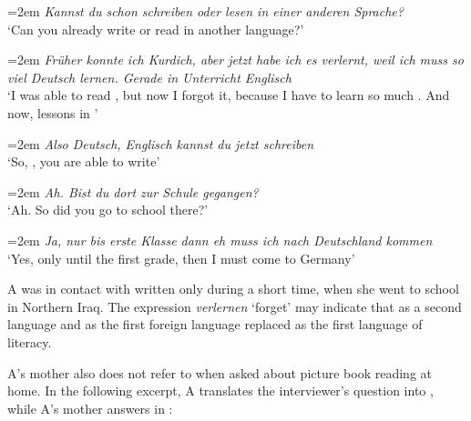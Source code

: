 \documentclass[output=paper,colorlinks,citecolor=brown]{langscibook}
\newenvironment{interview}{
  \setlength{\leftskip}{2.5em} %
  \setlength{\rightskip}{2.5em} %
  \setlength{\parindent}{0pt} %
  \vspace{\topsep} %
}{
  \vspace{\topsep} %
}
\newcommand{\speaker}[1]{%
  \noindent\hangindent=2em\makebox[1.5em][l]{#1:}\hspace{0.5em}%
}
\newcommand{\myattrib}[1]{%
    \attrib{#1}
}
\begin{document}
\begin{interview}\label{ch2.5.ex.15}
\speaker{I}\textit{Kannst du schon schreiben oder lesen in einer anderen Sprache?} \\
`Can you already write or read in another language?' 

\speaker{A}\textit{Früher konnte ich Kurdich, aber jetzt habe ich es verlernt, weil ich muss so viel Deutsch lernen. Gerade in Unterricht Englisch} \\
`I was able to read , but now I forgot it, because I have to learn so much . And now, lessons in ' 
\myattrib{Int 1\_A 30--31}

\speaker{I}\textit{Also Deutsch, Englisch kannst du jetzt schreiben} \\
`So, ,  you are able to write' 

\speaker{I}\textit{Ah. Bist du dort zur Schule gegangen?} \\
`Ah. So did you go to school there?' 

\speaker{A}\textit{Ja, nur bis erste Klasse dann eh muss ich nach Deutschland kommen} \\
`Yes, only until the first grade, then I must come to Germany' 
\myattrib{Int 1\_A, 48--49}
\end{interview}

A was in contact with written  only during a short time, when she went to school in Northern Iraq. The expression \textit{verlernen} `forget' may indicate that  as a second language and  as the first foreign language replaced  as the first language of literacy.

A's mother also does not refer to  when asked about picture book reading at home. In the following excerpt, A translates the interviewer's question into , while A's mother answers in :
\end{document}
